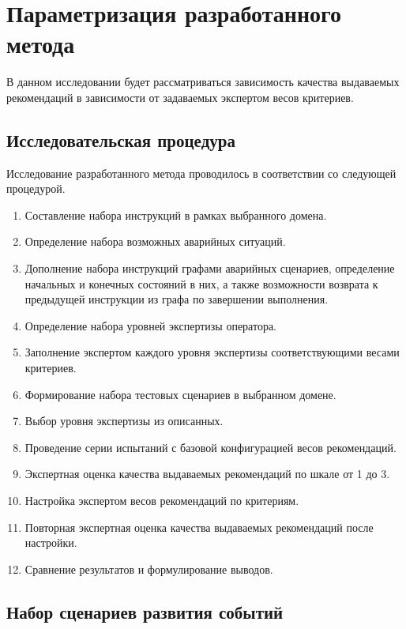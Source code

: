 \section{Параметризация разработанного метода}

В данном исследовании будет рассматриваться зависимость качества выдаваемых рекомендаций в зависимости от задаваемых экспертом весов критериев.

\subsection{Исследовательская процедура}

Исследование разработанного метода проводилось в соответствии со следующей процедурой.

\begin{enumerate}
\item Составление набора инструкций в рамках выбранного домена.
\item Определение набора возможных аварийных ситуаций.
\item Дополнение набора инструкций графами аварийных сценариев, определение начальных и конечных состояний в них, а также возможности возврата к предыдущей инструкции из графа по завершении выполнения.
\item Определение набора уровней экспертизы оператора.
\item Заполнение экспертом каждого уровня экспертизы соответствующими весами критериев.
\item Формирование набора тестовых сценариев в выбранном домене.
\item Выбор уровня экспертизы из описанных.
\item Проведение серии испытаний с базовой конфигурацией весов рекомендаций.
\item Экспертная оценка качества выдаваемых рекомендаций по шкале от 1 до 3.
\item Настройка экспертом весов рекомендаций по критериям.
\item Повторная экспертная оценка качества выдаваемых рекомендаций после настройки.
\item Сравнение результатов и формулирование выводов.
\end{enumerate}

\subsection{Набор сценариев развития событий}


